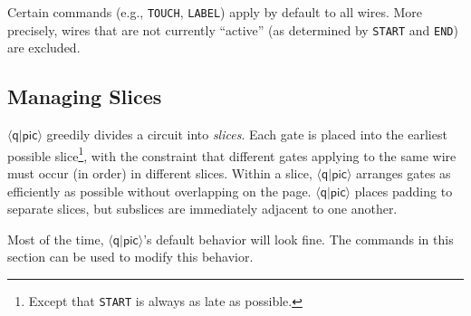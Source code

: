 \documentclass[twoside,12pt]{article}
\newcommand{\qpic}{$\langle\mathsf{q}|\mathsf{pic}\rangle$\xspace}
\begin{document}
\begin{description}
\begin{minipage}[b]{2in}

\end{minipage} \hfill 

Certain commands (e.g., {\tt TOUCH}, {\tt LABEL}) apply by default to all wires.  More
precisely, wires that are not currently ``active'' (as determined by {\tt START} and
{\tt END}) are excluded.

\end{description}

\subsection{Managing Slices}
\label{sec-qpic-touch}
\label{sec-qpic-depth}

\qpic greedily divides a circuit into \emph{slices}.  Each gate is placed into the earliest possible slice\footnote{Except that {\tt START} is always as late as possible.}, with
the constraint that different gates applying to the same wire must occur (in order) in different slices.
Within a slice, \qpic arranges gates as efficiently as possible without overlapping on the page.
\qpic places padding to separate slices, but subslices are immediately adjacent to one another.

Most of the time, \qpic's default behavior will look fine.  The commands in this section can be used to modify this behavior.

\begin{minipage}[b]{2in}

\end{minipage} \hfill 
\end{document}
